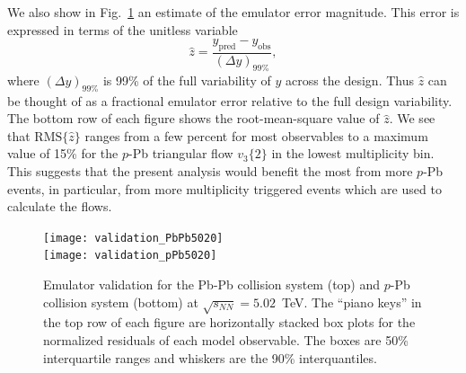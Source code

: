 \documentclass[aps,prc,reprint,amsmath,nofootinbib]{revtex4-1}
\newcommand{\sqrts}{\sqrt{s_{NN}}}
\begin{document}
We also show in Fig.~\ref{fig:validation_all} an estimate of the emulator error magnitude.
This error is expressed in terms of the unitless variable
\begin{equation}
  \hat{z} = \frac{y_\text{pred} - y_\text{obs}}{(\Delta y)_{99\%}},
\end{equation}
where $(\Delta y)_{99\%}$ is 99\% of the full variability of $y$ across the design.
Thus $\hat{z}$ can be thought of as a fractional emulator error relative to the full design variability.
The bottom row of each figure shows the root-mean-square value of $\hat{z}$.
We see that $\text{RMS}\{\hat{z}\}$ ranges from a few percent for most observables to a maximum value of 15\% for the $p$-Pb triangular flow $v_3\{2\}$ in the lowest multiplicity bin.
This suggests that the present analysis would benefit the most from more $p$-Pb events, in particular, from more multiplicity triggered events which are used to calculate the flows.

\begin{figure}
  \texttt{[image: validation\_PbPb5020]}\\
  \texttt{[image: validation\_pPb5020]}
  \caption{
    \label{fig:validation_all}
    Emulator validation for the Pb-Pb collision system (top) and $p$-Pb collision system (bottom) at $\sqrts=5.02$~TeV.
    The ``piano keys'' in the top row of each figure are horizontally stacked box plots for the normalized residuals of each model observable.
    The boxes are 50\% interquartile ranges and whiskers are the 90\% interquantiles.
  }
\end{figure}
\end{document}
